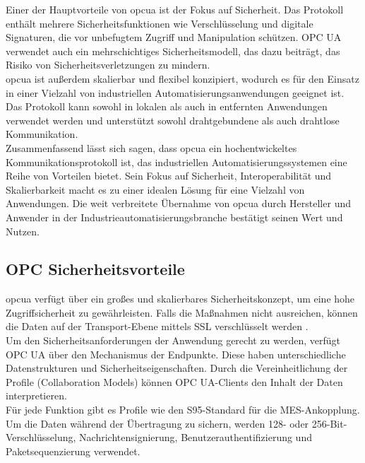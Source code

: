 Einer der Hauptvorteile von \ac{opcua} ist der Fokus auf Sicherheit. Das Protokoll enthält mehrere Sicherheitsfunktionen wie Verschlüsselung und digitale Signaturen, die vor unbefugtem Zugriff und Manipulation schützen. OPC UA verwendet auch ein mehrschichtiges Sicherheitsmodell, das dazu beiträgt, das Risiko von Sicherheitsverletzungen zu mindern.\\

\ac{opcua} ist außerdem skalierbar und flexibel konzipiert, wodurch es für den Einsatz in einer Vielzahl von industriellen Automatisierungsanwendungen geeignet ist. Das Protokoll kann sowohl in lokalen als auch in entfernten Anwendungen verwendet werden und unterstützt sowohl drahtgebundene als auch drahtlose Kommunikation.\\

Zusammenfassend lässt sich sagen, dass \ac{opcua} ein hochentwickeltes Kommunikationsprotokoll ist, das industriellen Automatisierungssystemen eine Reihe von Vorteilen bietet. Sein Fokus auf Sicherheit, Interoperabilität und Skalierbarkeit macht es zu einer idealen Lösung für eine Vielzahl von Anwendungen. Die weit verbreitete Übernahme von \ac{opcua} durch Hersteller und Anwender in der Industrieautomatisierungsbranche bestätigt seinen Wert und Nutzen.\\
\cite{Damm.2009}

\subsection{OPC Sicherheitsvorteile}

\ac{opcua} verfügt über ein großes und skalierbares Sicherheitskonzept, um eine hohe Zugriffsicherheit zu gewährleisten. Falls die Maßnahmen nicht ausreichen, können die Daten auf der Transport-Ebene mittels SSL verschlüsselt werden \cite{Team.06.03.2023}.\\

Um den Sicherheitsanforderungen der Anwendung gerecht zu werden, verfügt OPC UA über den Mechanismus der Endpunkte. Diese haben unterschiedliche Datenstrukturen und Sicherheitseigenschaften. Durch die Vereinheitlichung der Profile (Collaboration Models) können OPC UA-Clients den Inhalt der Daten interpretieren. \\

Für jede Funktion gibt es Profile wie den S95-Standard für die MES-Ankopplung\cite{Team.06.03.2023}. Um die Daten während der Übertragung zu sichern, werden 128- oder 256-Bit-Verschlüsselung, Nachrichtensignierung, Benutzerauthentifizierung und Paketsequenzierung verwendet.\\

